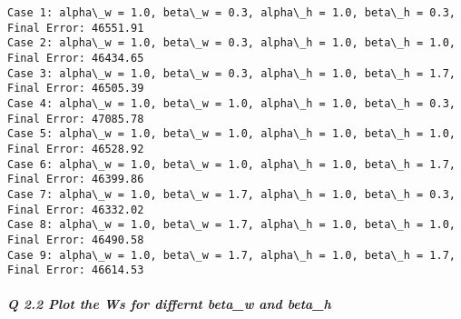 \documentclass[11pt]{article}
\begin{document}
    \begin{Verbatim}[commandchars=\\\{\}]
Case 1: alpha\_w = 1.0, beta\_w = 0.3, alpha\_h = 1.0, beta\_h = 0.3,  Final Error: 46551.91
Case 2: alpha\_w = 1.0, beta\_w = 0.3, alpha\_h = 1.0, beta\_h = 1.0,  Final Error: 46434.65
Case 3: alpha\_w = 1.0, beta\_w = 0.3, alpha\_h = 1.0, beta\_h = 1.7,  Final Error: 46505.39
Case 4: alpha\_w = 1.0, beta\_w = 1.0, alpha\_h = 1.0, beta\_h = 0.3,  Final Error: 47085.78
Case 5: alpha\_w = 1.0, beta\_w = 1.0, alpha\_h = 1.0, beta\_h = 1.0,  Final Error: 46528.92
Case 6: alpha\_w = 1.0, beta\_w = 1.0, alpha\_h = 1.0, beta\_h = 1.7,  Final Error: 46399.86
Case 7: alpha\_w = 1.0, beta\_w = 1.7, alpha\_h = 1.0, beta\_h = 0.3,  Final Error: 46332.02
Case 8: alpha\_w = 1.0, beta\_w = 1.7, alpha\_h = 1.0, beta\_h = 1.0,  Final Error: 46490.58
Case 9: alpha\_w = 1.0, beta\_w = 1.7, alpha\_h = 1.0, beta\_h = 1.7,  Final Error: 46614.53

    \end{Verbatim}

    \subparagraph{Q 2.2 Plot the Ws for differnt beta\_w and
beta\_h}\label{q-2.2-plot-the-ws-for-differnt-beta_w-and-beta_h}
\end{document}
